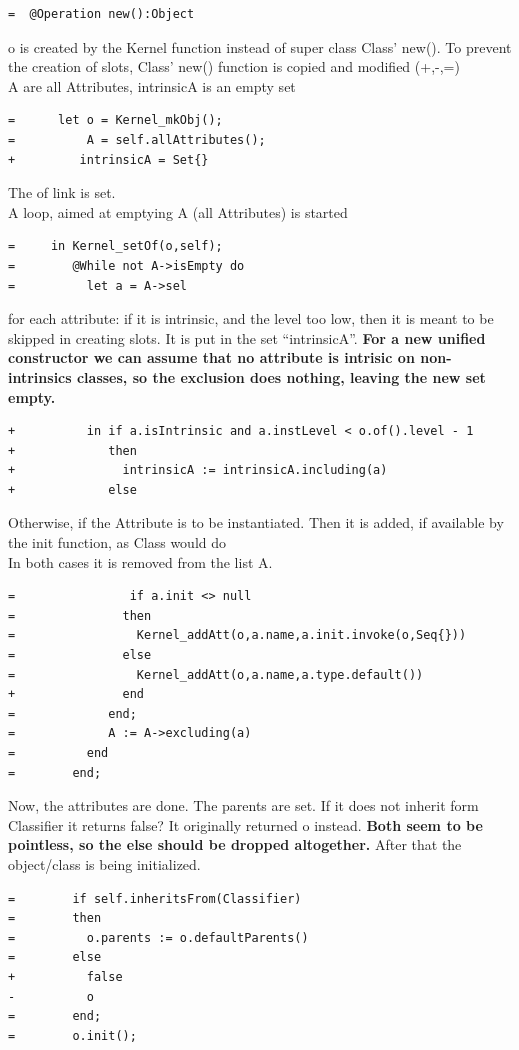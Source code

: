 \documentclass{scrreprt}
\begin{document}
\begin{verbatim}
=  @Operation new():Object
\end{verbatim}
o is created by the Kernel function instead of super class Class' new(). To prevent the creation of slots, Class' new() function is copied and modified (+,-,=)\\
A are all Attributes, intrinsicA is an empty set
\begin{verbatim}
=      let o = Kernel_mkObj();
=          A = self.allAttributes();
+         intrinsicA = Set{}
\end{verbatim}
The of link is set.\\
A loop, aimed at emptying A (all Attributes) is started
\begin{verbatim}
=     in Kernel_setOf(o,self);
=        @While not A->isEmpty do
=          let a = A->sel
\end{verbatim}
for each attribute: if it is intrinsic, and the level too low, then it is meant to be skipped in creating slots. It is put in the set "`intrinsicA"'. \textbf{For a new unified constructor we can assume that no attribute is intrisic on non-intrinsics classes, so the exclusion does nothing, leaving the new set empty.}
\begin{verbatim}
+          in if a.isIntrinsic and a.instLevel < o.of().level - 1
+             then
+               intrinsicA := intrinsicA.including(a)
+             else
\end{verbatim}
Otherwise, if the Attribute is to be instantiated. Then it is added, if available by the init function, as Class would do\\
In both cases it is removed from the list A.
\begin{verbatim}
=                if a.init <> null
=               then
=                 Kernel_addAtt(o,a.name,a.init.invoke(o,Seq{}))
=               else
=                 Kernel_addAtt(o,a.name,a.type.default())
+               end
=             end;
=             A := A->excluding(a)
=          end
=        end;
\end{verbatim}
Now, the attributes are done. The parents are set. If it does not inherit form Classifier it returns false? 
It originally returned o instead. \textbf{Both seem to be pointless, so the else should be dropped altogether.} After that the object/class is being initialized. 
\begin{verbatim}
=        if self.inheritsFrom(Classifier)
=        then
=          o.parents := o.defaultParents()
=        else
+          false
-          o
=        end;
=        o.init();
\end{verbatim}
\end{document}
